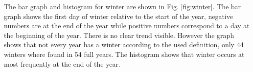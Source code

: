 The bar graph and histogram for winter are shown in Fig. \ref{fig:winter}. The bar graph shows the first day of winter relative to the start of the year, negative numbers are at the end of the year while positive numbers correspond to a day at the beginning of the year. There is no clear trend visible. However the graph shows that not every year has a winter according to the used definition, only 44 winters where found in 54 full years. The histogram shows that winter occurs at most frequently at the end of the year. 

















